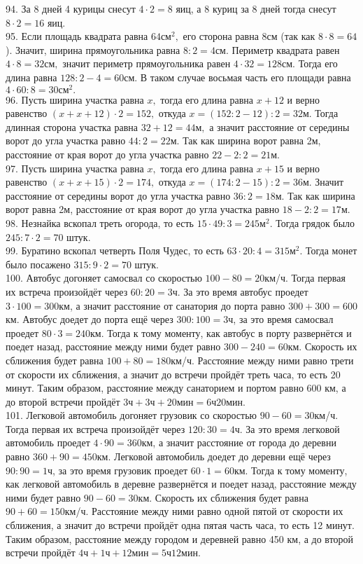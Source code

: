 94. За 8 дней 4 курицы снесут $4\cdot2=8$ яиц, а 8 куриц за 8 дней тогда снесут $8\cdot2=16$ яиц.\\
95. Если площадь квадрата равна $64\text{см}^2,$ его сторона равна $8\text{см}$ (так как $8\cdot8=64$). Значит, ширина прямоугольника равна $8:2=4\text{см}.$ Периметр квадрата равен $4\cdot8=32\text{см},$ значит периметр прямоугольника равен $4\cdot32=128$см. Тогда его длина равна $128:2-4=60$см. В таком случае восьмая
часть его площади равна $4\cdot60:8=30\text{см}^2.$\\
96. Пусть ширина участка равна $x,$ тогда его длина равна $x+12$ и верно равенство $(x+x+12)\cdot2=152,$ откуда $x=(152:2-12):2=32\text{м}.$ Тогда длинная сторона участка равна $32+12=44\text{м},$ а значит расстояние от середины ворот до угла участка равно $44:2=22\text{м}.$ Так как ширина ворот равна 2м, расстояние от края ворот до угла участка равно $22-2:2=21\text{м}.$\\
97. Пусть ширина участка равна $x,$ тогда его длина равна $x+15$ и верно равенство $(x+x+15)\cdot2=174,$ откуда $x=(174:2-15):2=36\text{м}.$ Значит расстояние от середины ворот до угла участка равно $36:2=18\text{м}.$ Так как ширина ворот равна 2м, расстояние от края ворот до угла участка равно $18-2:2=17\text{м}.$\\
98. Незнайка вскопал треть огорода, то есть $15\cdot49:3=245\text{м}^2.$ Тогда грядок было $245:7\cdot2=70$ штук.\\
99. Буратино вскопал четверть Поля Чудес, то есть $63\cdot20:4=315\text{м}^2.$ Тогда монет было посажено $315:9\cdot2=70$ штук.\\
100. Автобус догоняет самосвал со скоростью $100-80=20$км/ч. Тогда первая их встреча произойдёт через $60:20=3$ч. За это время автобус проедет $3\cdot100=300$км, а значит расстояние от санатория до порта равно $300+300=600$км. Автобус доедет до порта ещё через $300:100=3$ч, за это время самосвал проедет $80\cdot3=240$км. Тогда к тому моменту, как автобус в порту развернётся и поедет назад, расстояние между ними будет равно $300-240=60$км. Скорость их сближения будет равна $100+80=180$км/ч. Расстояние между ними равно трети от скорости их сближения, а значит до встречи пройдёт треть часа, то есть 20 минут. Таким образом, расстояние между санаторием и портом равно 600 км, а до второй встречи пройдёт $3\text{ч}+3\text{ч}+20\text{мин}=6\text{ч}20\text{мин}.$\\
101. Легковой автомобиль догоняет грузовик со скоростью $90-60=30$км/ч. Тогда первая их встреча произойдёт через $120:30=4$ч. За это время легковой автомобиль проедет $4\cdot90=360$км, а значит расстояние от города до деревни равно $360+90=450$км. Легковой автомобиль доедет до деревни ещё через $90:90=1$ч, за это время грузовик проедет $60\cdot1=60$км. Тогда к тому моменту, как легковой автомобиль в деревне развернётся и поедет назад, расстояние между ними будет равно $90-60=30$км. Скорость их сближения будет равна $90+60=150$км/ч. Расстояние между ними равно одной пятой от скорости их сближения, а значит до встречи пройдёт одна пятая часть часа, то есть 12 минут. Таким образом, расстояние между городом и деревней равно 450 км, а до второй встречи пройдёт $4\text{ч}+1\text{ч}+12\text{мин}=5\text{ч}12\text{мин}.$\\
